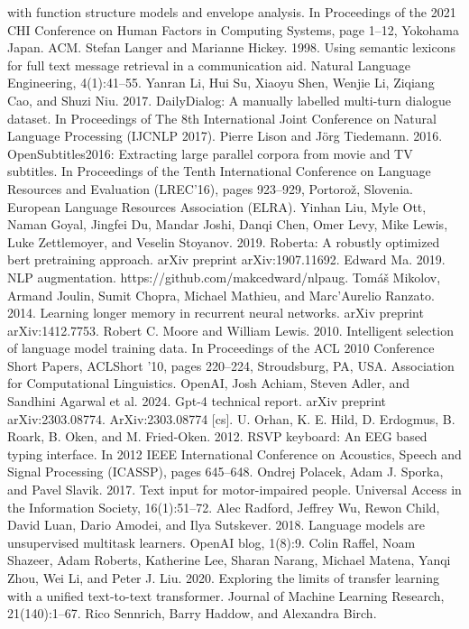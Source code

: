 with function structure models and envelope analysis. In Proceedings of the 2021 CHI Conference on
Human Factors in Computing Systems, page 1–12,
Yokohama Japan. ACM.
Stefan Langer and Marianne Hickey. 1998. Using semantic lexicons for full text message retrieval in a
communication aid. Natural Language Engineering,
4(1):41–55.
Yanran Li, Hui Su, Xiaoyu Shen, Wenjie Li, Ziqiang
Cao, and Shuzi Niu. 2017. DailyDialog: A manually
labelled multi-turn dialogue dataset. In Proceedings
of The 8th International Joint Conference on Natural
Language Processing (IJCNLP 2017).
Pierre Lison and Jörg Tiedemann. 2016. OpenSubtitles2016: Extracting large parallel corpora from
movie and TV subtitles. In Proceedings of the Tenth
International Conference on Language Resources
and Evaluation (LREC’16), pages 923–929, Portorož,
Slovenia. European Language Resources Association
(ELRA).
Yinhan Liu, Myle Ott, Naman Goyal, Jingfei Du, Mandar Joshi, Danqi Chen, Omer Levy, Mike Lewis,
Luke Zettlemoyer, and Veselin Stoyanov. 2019.
Roberta: A robustly optimized bert pretraining approach. arXiv preprint arXiv:1907.11692.
Edward Ma. 2019. NLP augmentation.
https://github.com/makcedward/nlpaug.
Tomáš Mikolov, Armand Joulin, Sumit Chopra, Michael
Mathieu, and Marc’Aurelio Ranzato. 2014. Learning
longer memory in recurrent neural networks. arXiv
preprint arXiv:1412.7753.
Robert C. Moore and William Lewis. 2010. Intelligent selection of language model training data. In
Proceedings of the ACL 2010 Conference Short Papers, ACLShort ’10, pages 220–224, Stroudsburg,
PA, USA. Association for Computational Linguistics.
OpenAI, Josh Achiam, Steven Adler, and Sandhini Agarwal et al. 2024. Gpt-4 technical report. arXiv
preprint arXiv:2303.08774. ArXiv:2303.08774 [cs].
U. Orhan, K. E. Hild, D. Erdogmus, B. Roark, B. Oken,
and M. Fried-Oken. 2012. RSVP keyboard: An EEG
based typing interface. In 2012 IEEE International
Conference on Acoustics, Speech and Signal Processing (ICASSP), pages 645–648.
Ondrej Polacek, Adam J. Sporka, and Pavel Slavik.
2017. Text input for motor-impaired people. Universal Access in the Information Society, 16(1):51–72.
Alec Radford, Jeffrey Wu, Rewon Child, David Luan,
Dario Amodei, and Ilya Sutskever. 2018. Language
models are unsupervised multitask learners. OpenAI
blog, 1(8):9.
Colin Raffel, Noam Shazeer, Adam Roberts, Katherine Lee, Sharan Narang, Michael Matena, Yanqi
Zhou, Wei Li, and Peter J. Liu. 2020. Exploring the
limits of transfer learning with a unified text-to-text
transformer. Journal of Machine Learning Research,
21(140):1–67.
Rico Sennrich, Barry Haddow, and Alexandra Birch.
